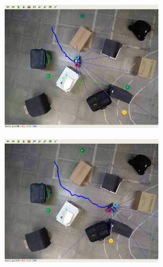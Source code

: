 \begin{figure}[H]
\begin{center}
\begin{subfigure}[b]{0.60\textwidth}
\begin{subfigure}[b]{0.24\textwidth}
            \includegraphics[width=\textwidth]{imagens/real_envs/real_env2_sac/3.png}
        \end{subfigure}
        \hfill
        \begin{subfigure}[b]{0.24\textwidth}
            \includegraphics[width=\textwidth]{imagens/real_envs/real_env2_ddpg/4.png}
        \end{subfigure}
        

\end{subfigure}
\end{center}
\end{figure}
